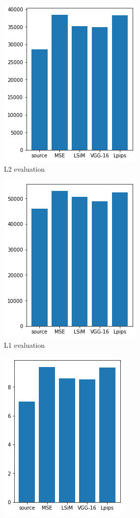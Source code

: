 \documentclass[a4paper,12pt,twoside]{report}
\begin{document}
	\begin{figure}
		\centering
		\begin{subfigure}{0.32\textwidth}
			\centering
			\includegraphics[scale=0.49]{buoyancy_low/l2.png}
			\caption{L2 evaluation}
		\end{subfigure}
		\begin{subfigure}{0.32\textwidth}
			\centering
			\includegraphics[scale=0.49]{buoyancy_low/l1.png}
			\caption{L1 evaluation}
		\end{subfigure}
		\begin{subfigure}{0.32\textwidth}
			\centering
			\includegraphics[scale=0.49]{buoyancy_low/mse_eval.png}

\end{subfigure}
\end{figure}
\end{document}
